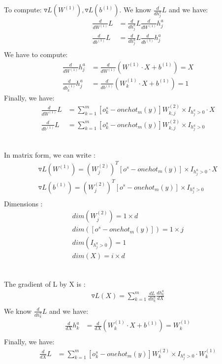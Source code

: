 \documentclass[12pt]{article}
\begin{document}
\subsection{}
To compute: $\triangledown L(W^{(1)}), \triangledown L(b^{(1)})$.
We know $\frac{d}{dh^a_j} L$ and we have:
\begin{align*}
\frac{d}{dW^{(1)}} L &= \frac{d}{dh^a_j} L \frac{d}{dW^{(1)}} h^a_j \\
\frac{d}{db^{(1)}} L &= \frac{d}{dh^a_j} L \frac{d}{db^{(1)}} h^a_j \\
\end{align*}
We have to compute:
\begin{align*}
\frac{d}{dW^{(1)}} h^a_j & = \frac{d}{dW^{(1)}} (W^{(1)} \cdot X + b^{(1)}) = X \\
\frac{d}{db^{(1)}_{k}} h^a_j &= \frac{d}{db^{(1)}} (W^{(1)}_{k} \cdot X + b^{(1)}) = 1
\end{align*}
Finally, we have:
\begin{align*}
\frac{d}{dW^{(1)}} L & =  \sum\limits_{k=1}^m [o^s_k - onehot_m(y)]  W^{(2)}_{k,j} \times I_{h^a_j > 0} \cdot X \\
\frac{d}{db^{(1)}} L & =   \sum\limits_{k=1}^m [o^s_k - onehot_m(y)]  W^{(2)}_{k,j} \times I_{h^a_j > 0} \\
\end{align*}
\subsection{}
In matrix form, we can write :
\begin{align*}
\triangledown L(W^{(1)}) =(W^{(2)}_j)^T [o^s - onehot_m(y)] \times I_{h^a_j > 0} \cdot X \\
\triangledown L(b^{(1)}) =(W^{(2)}_j)^T [o^s - onehot_m(y)] \times I_{h^a_j > 0} \\
\end{align*}
Dimensions :
\begin{align*}
dim(W^{(2)}_j ) = 1 \times d \\
dim([o^s - onehot_m(y)]) = 1 \times j \\
dim(I_{h^a_j > 0}) = 1 \\
dim(X) = i \times d \\
\end{align*}
\subsection{}
The gradient of L by X is :
\begin{align*}
\triangledown L(X) = \sum\limits_{k=1}^m \frac{dL}{dh^a_k} \frac{d{h^a_k}}{dX} \\
\end{align*}
We know $\frac{d}{dh^a_k} L$ and we have:
\begin{align*}
\frac{d}{dX} h^a_k & = \frac{d}{dX} (W^{(1)}_k \cdot X + b^{(1)}) = W^{(1)}_k \\
\end{align*}
Finally, we have:
\begin{align*}
\frac{d}{dX} L &  = \sum\limits_{k=1}^m [o^s_k - onehot_m(y)]  W^{(2)}_{k} \times I_{h^a_j > 0} \cdot W^{(1)}_{k} \\
\end{align*}
\end{document}
